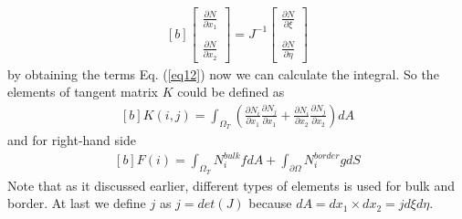 \documentclass[]{article}
\begin{document}
\begin{equation}\label{eq17}
	\begin{aligned}[b]
\begin{bmatrix}
	\frac{\partial N}{\partial x_{1}}\\
	\\
	\frac{\partial N}{\partial x_{2}}  
\end{bmatrix}
= J^{-1}
\begin{bmatrix}
	\frac{\partial N}{\partial \xi}\\
	\\
	\frac{\partial N}{\partial \eta}
\end{bmatrix}
	\end{aligned}
\end{equation}
 by obtaining the terms Eq. (\ref{eq12}) now we can calculate the integral. So the elements of tangent matrix $K$ could be defined as
\begin{equation}\label{eq18}
	\begin{aligned}[b]
		K(i,j) = \int_{\Omega_{T}} (\frac{\partial N_{i}}{\partial x_{1}}
		\frac{\partial N_{j}}{\partial x_{1}}+\frac{\partial N_{i}}{\partial x_{2}} 
		\frac{\partial N_{j}}{\partial x_{2}}) dA
	\end{aligned}
\end{equation}
and for right-hand side
\begin{equation}\label{eq19}
	\begin{aligned}[b]
		F(i) = \int_{\Omega_{T}} N^{bulk}_{i}f dA + \int_{\partial \Omega} N^{border}_i g dS
	\end{aligned}
\end{equation}
Note that as it discussed earlier, different types of elements is used for bulk and border. At last we define $j$ as $j=det(J)$ because $dA=dx_{1} \times dx_{2}=jd\xi d\eta$.
\end{document}
